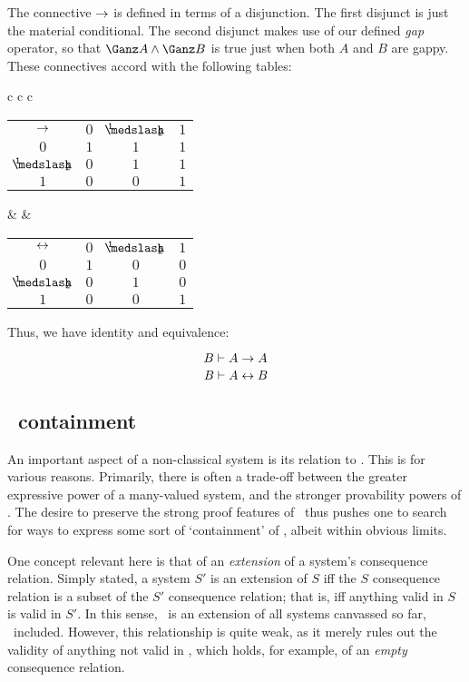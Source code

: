 The connective $\rightarrow$ is defined in terms of a disjunction. The first disjunct is just the material conditional. The second disjunct makes use of our defined \emph{gap} operator, so that $\Gap A \wedge \Gap B$ is true just when both $A$ and $B$ are gappy. These connectives accord with the following tables:
\begin{singlespace}
\begin{longtable}{c c c}
\begin{tabular}{c | c c c}
$\rightarrow$ & $0$ & $\oneHalf$ & $1$ \\
\cline{1-4} 
$0$ & $1$ & $1$ & $1$ \\
$\oneHalf$ & $0$ & $1$ & $1$ \\
$1$ & $0$ & $0$ & $1$ \\
\end{tabular}
 & & 
\begin{tabular}{c | c c c}
$\leftrightarrow$ & $0$ & $\oneHalf$ & $1$ \\
\cline{1-4} 
$0$ & $1$ & $0$ & $0$ \\
$\oneHalf$ & $0$ & $1$ & $0$ \\
$1$ & $0$ & $0$ & $1$ \\
\end{tabular}
\end{longtable}
\end{singlespace}
\noindent Thus, we have identity and equivalence:

\[ {B}\vdash{A\ensuremath{\rightarrow}A} \]
\[ {B}\vdash{A \ensuremath{\leftrightarrow}B} \]

\subsection{\CPL\ containment}\label{cplContainment}

An important aspect of a non-classical system is its relation to \CPL. This is for various reasons. Primarily, there is often a trade-off between the greater expressive power of a many-valued system, and the stronger provability powers of \CPL. The desire to preserve the strong proof features of \CPL\ thus pushes one to search for ways to express some sort of `containment' of \CPL, albeit within obvious limits.

One concept relevant here is that of an \emph{extension} of a system's consequence relation. Simply stated, a system $S'$ is an extension of $S$ iff the $S$ consequence relation is a subset of the $S'$ consequence relation; that is, iff anything valid in $S$ is valid in $S'$. In this sense, \CPL\ is an extension of all systems canvassed so far, \GO\ included. However, this relationship is quite weak, as it merely rules out the validity of anything not valid in \CPL, which holds, for example, of an \emph{empty} consequence relation.

